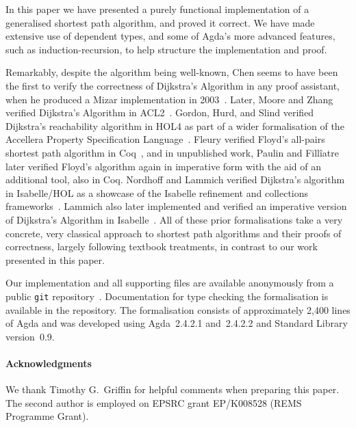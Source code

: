 In this paper we have presented a purely functional implementation of a generalised shortest path algorithm, and proved it correct.
We have made extensive use of dependent types, and some of Agda's more advanced features, such as induction-recursion, to help structure the implementation and proof.

Remarkably, despite the algorithm being well-known, Chen seems to have been the first to verify the correctness of Dijkstra's Algorithm in any proof assistant, when he produced a Mizar implementation in 2003~\cite{chen:dijkstra:2003}.
Later, Moore and Zhang verified Dijkstra's Algorithm in ACL2~\cite{moore:proof-pearl:2005}.
Gordon, Hurd, and Slind verified Dijkstra's reachability algorithm in HOL4 as part of a wider formalisation of the Accellera Property Specification Language~\cite{gordon:executing:2003}.
Fleury verified Floyd's all-pairs shortest path algorithm in Coq~\cite{fleury:implantation:1990}, and in unpublished work, Paulin and Fill\^iatre later verified Floyd's algorithm again in imperative form with the aid of an additional tool, also in Coq.
Nordhoff and Lammich verified Dijkstra's algorithm in Isabelle/HOL as a showcase of the Isabelle refinement and collections frameworks~\cite{nordhoff-dijkstra-2012}.
Lammich also later implemented and verified an imperative version of Dijkstra's Algorithm in Isabelle~\cite{lammich:refinement:2015}.
All of these prior formalisations take a very concrete, very classical approach to shortest path algorithms and their proofs of correctness, largely following textbook treatments, in contrast to our work presented in this paper.


Our implementation and all supporting files are available anonymously from a public \texttt{git} repository~\cite{markert_formalised_2015}.
Documentation for type checking the formalisation is available in the repository.
The formalisation consists of approximately 2,400 lines of Agda and was developed using Agda~2.4.2.1 and~2.4.2.2 and Standard Library version~0.9.

\paragraph{Acknowledgments}
We thank Timothy G.~Griffin for helpful comments when preparing this paper.
The second author is employed on EPSRC grant EP/K008528 (REMS Programme Grant).
